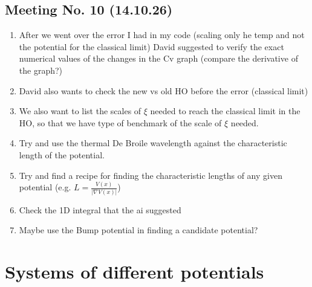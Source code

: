 \documentclass{article}
\numberwithin{equation}{subsection}
\begin{document}
\subsection*{Meeting No. 10 (14.10.26)}
\begin{enumerate}[label=\textbf{\Alph*.}]
\item After we went over the error I had in my code (scaling only he temp and not the potential for the classical limit) David suggested to verify the exact numerical values of the changes in the Cv graph (compare the derivative of the graph?)
\item David also wants to check the new vs old HO before the error (classical limit)
\item We also want to list the scales of $\xi$ needed to reach the classical limit in the HO, so that we have type of benchmark of the scale of $\xi$ needed.
\item Try and use the thermal De Broile wavelength against the characteristic length of the potential.
\item Try and find a recipe for finding the characteristic lengths of any given potential (e.g. $L=\frac{V(x)}{|\nabla V(x)|}$)
\item Check the 1D integral that the ai suggested
\item Maybe use the Bump potential in finding a candidate potential?
\end{enumerate}

\section{Systems of different potentials}
\end{document}
